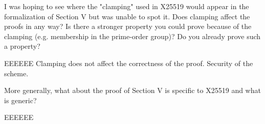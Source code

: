I was hoping to see where the "clamping" used in X25519 would appear in the
formalization of Section V but was unable to spot it. Does clamping affect the
proofs in any way? Is there a stronger property you could prove because of the
clamping (e.g. membership in the prime-order group)?
Do you already prove such a property?

\begin{answer}{EEEEEE}
Clamping does not affect the correctness of the proof.
Security of the scheme.
\end{answer}

More generally, what about the proof of
Section V is specific to X25519 and what is generic?

\begin{answer}{EEEEEE}
\end{answer}
